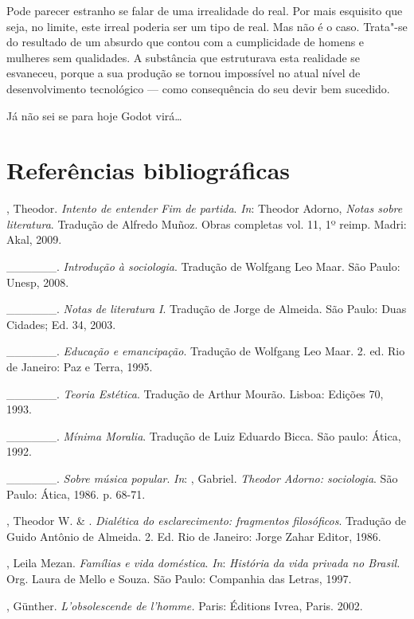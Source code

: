Pode parecer estranho se falar de uma irrealidade do real. Por mais
esquisito que seja, no limite, este irreal poderia ser um tipo de real.
Mas não é o caso. Trata"-se do resultado de um absurdo que contou com a
cumplicidade de homens e mulheres sem qualidades. A substância que
estruturava esta realidade se esvaneceu, porque a sua produção se tornou
impossível no atual nível de desenvolvimento tecnológico --- como
consequência do seu devir bem sucedido.

Já não sei se para hoje Godot virá\ldots{}

\chapter{Referências bibliográficas}


\begin{Parskip}
, Theodor. \emph{Intento de entender Fim de partida}. \emph{In}: Theodor
Adorno, \emph{Notas sobre literatura}. Tradução de Alfredo Muñoz. Obras
completas vol. 11, 1º reimp. Madri: Akal, 2009.

\_\_\_\_\_\_. \emph{Introdução à sociologia}. Tradução de Wolfgang Leo
Maar. São Paulo: Unesp, 2008.

\_\_\_\_\_\_. \emph{Notas de literatura I}. Tradução de Jorge de
Almeida. São Paulo: Duas Cidades; Ed. 34, 2003.

\_\_\_\_\_\_. \emph{Educação e emancipação}. Tradução de Wolfgang Leo
Maar. 2. ed. Rio de Janeiro: Paz e Terra, 1995.

\_\_\_\_\_\_. \emph{Teoria Estética}. Tradução de Arthur Mourão.
Lisboa: Edições 70, 1993.

\_\_\_\_\_\_. \emph{Mínima Moralia}. Tradução de Luiz Eduardo Bicca.
São paulo: Ática, 1992.

\_\_\_\_\_\_. \emph{Sobre música popular}. \emph{In}: , Gabriel. \emph{Theodor
Adorno: sociologia}. São Paulo: Ática, 1986. p. 68-71.

, Theodor W. \& . \emph{Dialética do esclarecimento:
fragmentos filosóficos}. Tradução de Guido Antônio de Almeida. 2. Ed.
Rio de Janeiro: Jorge Zahar Editor, 1986.

, Leila Mezan. \emph{Famílias e vida doméstica}. \emph{In}:
\emph{História da vida privada no Brasil.} Org. Laura de Mello e Souza.
São Paulo: Companhia das Letras, 1997.

, Günther. \emph{L'obsolescende de l'homme.} Paris: Éditions
Ivrea, Paris. 2002.


\end{Parskip}
